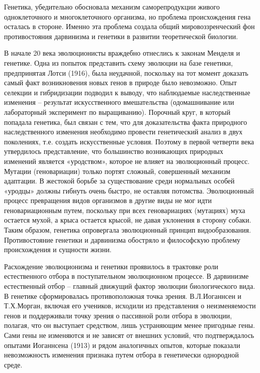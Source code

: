 \documentclass[exam_answers.tex]{subfiles}
\begin{document}
\renewcommand{\baselinestretch}{\blch}

Генетика, убедительно обосновала механизм саморепродукции живого
одноклеточного и многоклеточного организма, но проблема происхождения
гена осталась в стороне. Именно эта проблема создала общий
мировоззренческий фон противостояния дарвинизма и генетики в развитии
теоретической биологии.

В начале 20 века эволюционисты враждебно отнеслись к законам Менделя
и генетике. Одна из попыток представить схему эволюции на базе генетики,
предпринятая Лотси (1916), была неудачной, поскольку на тот момент доказать
самый факт возникновения новых генов в природе было невозможно. Опыт
селекции и гибридизации подводил к выводу, что наблюдаемые
наследственные изменения – результат искусственного вмешательства
(одомашнивание или лабораторный эксперимент по выращиванию). Порочный
круг, в который попадала генетика, был связан с тем, что для доказательства
факта природного наследственного изменения необходимо провести
генетический анализ в двух поколениях, т.е. создать искусственные условия.
Поэтому в первой четверти века утвердилось представление, что большинство
возникающих природных изменений является «уродством», которое не влияет
на эволюционный процесс. Мутации (геновариации) только портят сложный,
совершенный механизм адаптации. В жестокой борьбе за существование среди
нормальных особей «уродцы» должны гибнуть очень быстро, не оставляя
потомства. Эволюционный процесс превращения видов организмов в другие
виды не мог идти геновариационным путем, поскольку при всех геновариациях
(мутациях) муха остается мухой, а крыса остается крысой, не давая уклонения в
сторону собаки. Таким образом, генетика опровергала эволюционный принцип
видообразования. Противостояние генетики и дарвинизма обостряло и
философскую проблему происхождения и сущности жизни.

Расхождение эволюционизма и генетики проявилось в трактовке роли
естественного отбора в поступательном эволюционном процессе. В дарвинизме
естественный отбор – главный движущий фактор эволюции биологического
вида. В генетике сформировалась противоположная точка зрения.
В.Л.Иоганнсен и Т.Х.Морган, включая его учеников, исходили из
представления о неизменяемости генов и поддерживали точку зрения о
пассивной роли отбора в эволюции, полагая, что он выступает средством, лишь
устраняющим менее пригодные гены. Сами гены не изменяются и не зависят от
внешних условий, что подтверждалось опытами Иоганнсена (1913) и рядом
аналогичных опытов, которые показали невозможность изменения признака
путем отбора в генетически однородной среде.
\end{document}
